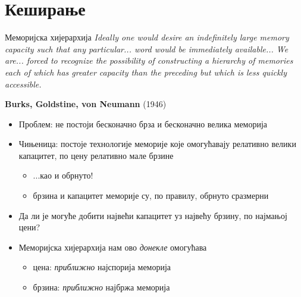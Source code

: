 \documentclass[xcolor=table]{beamer}
\begin{document}
    \section{Кеширање}
    
    \begin{frame}[allowframebreaks]{Меморијска хијерархија}
        \textit{
            Ideally one would desire an indefinitely large
            memory capacity such that any particular... word
            would be immediately available... We are... forced
            to recognize the possibility of constructing a
            hierarchy of memories each of which has greater
            capacity than the preceding but which is less
            quickly accessible.
        }

        \begin{flushright}
            \textbf{Burks, Goldstine, von Neumann} (1946)
        \end{flushright} 

        \framebreak
        
        \begin{itemize}
            \item Проблем: не постоји бесконачно брза и бесконачно велика меморија
            \item Чињеница: постоје технологије меморије које омогућавају релативно велики капацитет, по цену релативно мале брзине
            \begin{itemize}
                \item ...као и обрнуто!
                \item брзина и капацитет меморије су, по правилу, обрнуто сразмерни
            \end{itemize}
            \item Да ли је могуће добити највећи капацитет уз највећу брзину, по најмањој цени?
            \item Меморијска хијерархија нам ово \textit{донекле} омогућава
            \begin{itemize}
                \item цена: \textit{приближно} најспорија меморија
                \item брзина: \textit{приближно} најбржа меморија
            \end{itemize}
        \end{itemize}
        
        \framebreak


\end{frame}
\end{document}
